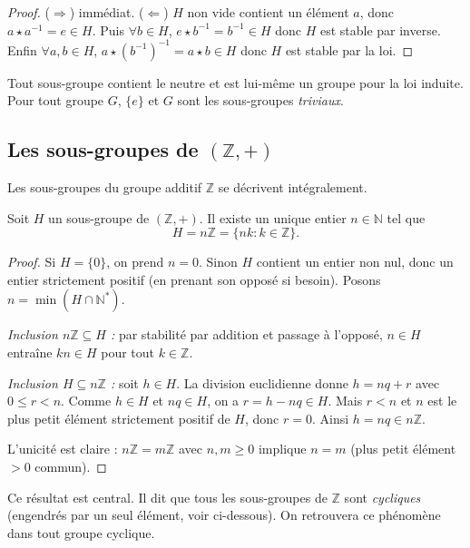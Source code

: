 \begin{proof}
($\Rightarrow$) immédiat. ($\Leftarrow$) $H$ non vide contient un élément $a$, donc $a \star a^{-1} = e \in H$. Puis $\forall b \in H$, $e \star b^{-1} = b^{-1} \in H$ donc $H$ est stable par inverse. Enfin $\forall a, b \in H$, $a \star (b^{-1})^{-1} = a \star b \in H$ donc $H$ est stable par la loi.
\end{proof}

\begin{remarque}
Tout sous-groupe contient le neutre et est lui-même un groupe pour la loi induite. Pour tout groupe $G$, $\{e\}$ et $G$ sont les sous-groupes \emph{triviaux}.
\end{remarque}

\subsection{Les sous-groupes de $(\mathbb{Z}, +)$}

Les sous-groupes du groupe additif $\mathbb{Z}$ se décrivent intégralement.

\begin{theoreme}
Soit $H$ un sous-groupe de $(\mathbb{Z}, +)$. Il existe un unique entier $n \in \mathbb{N}$ tel que
\[ H = n\mathbb{Z} = \{nk : k \in \mathbb{Z}\}. \]
\end{theoreme}

\begin{proof}
Si $H = \{0\}$, on prend $n = 0$. Sinon $H$ contient un entier non nul, donc un entier strictement positif (en prenant son opposé si besoin). Posons $n = \min(H \cap \mathbb{N}^*)$.

\emph{Inclusion $n\mathbb{Z} \subseteq H$ :} par stabilité par addition et passage à l'opposé, $n \in H$ entraîne $kn \in H$ pour tout $k \in \mathbb{Z}$.

\emph{Inclusion $H \subseteq n\mathbb{Z}$ :} soit $h \in H$. La division euclidienne donne $h = nq + r$ avec $0 \le r < n$. Comme $h \in H$ et $nq \in H$, on a $r = h - nq \in H$. Mais $r < n$ et $n$ est le plus petit élément strictement positif de $H$, donc $r = 0$. Ainsi $h = nq \in n\mathbb{Z}$.

L'unicité est claire : $n\mathbb{Z} = m\mathbb{Z}$ avec $n, m \ge 0$ implique $n = m$ (plus petit élément $> 0$ commun).
\end{proof}

\begin{remarque}
Ce résultat est central. Il dit que tous les sous-groupes de $\mathbb{Z}$ sont \emph{cycliques} (engendrés par un seul élément, voir ci-dessous). On retrouvera ce phénomène dans tout groupe cyclique.
\end{remarque}

